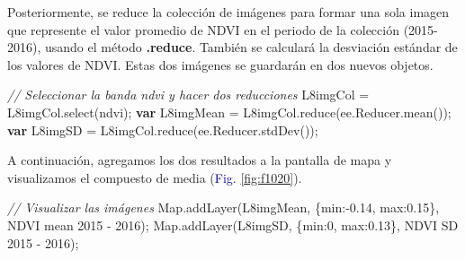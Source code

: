 \documentclass[
  12pt,
  letterpaper,
  twoside]{book}
\newenvironment{Shaded}{\begin{snugshade}}{\end{snugshade}}
\newcommand{\AttributeTok}[1]{\textcolor[rgb]{0.48,0.12,0.64}{#1}}
\newcommand{\BuiltInTok}[1]{#1}
\newcommand{\CommentTok}[1]{\textcolor[rgb]{0.24,0.58,0.00}{\textit{#1}}}
\newcommand{\DataTypeTok}[1]{\textcolor[rgb]{0.00,0.00,0.00}{#1}}
\newcommand{\DecValTok}[1]{\textcolor[rgb]{0.28,0.53,0.93}{#1}}
\newcommand{\FloatTok}[1]{\textcolor[rgb]{0.28,0.53,0.93}{#1}}
\newcommand{\FunctionTok}[1]{\textcolor[rgb]{0.48,0.12,0.64}{#1}}
\newcommand{\KeywordTok}[1]{\textcolor[rgb]{0.00,0.00,0.00}{\textbf{#1}}}
\newcommand{\NormalTok}[1]{#1}
\newcommand{\OperatorTok}[1]{\textcolor[rgb]{0.00,0.00,0.00}{#1}}
\newcommand{\StringTok}[1]{\textcolor[rgb]{0.87,0.29,0.22}{#1}}
\newcommand\boldpurple[1]{\textcolor{darkpurple}{\textbf{#1}}}
\begin{document}
Posteriormente, se reduce la colección de imágenes para formar una sola imagen que represente el valor promedio de NDVI en el periodo de la colección (2015-2016), usando el método \boldpurple{.reduce}. También se calculará la desviación estándar de los valores de NDVI. Estas dos imágenes se guardarán en dos nuevos objetos.

\begin{Shaded}
\begin{Highlighting}[]
\CommentTok{// Seleccionar la banda ndvi y hacer dos reducciones}
\NormalTok{L8imgCol }\OperatorTok{=}\NormalTok{ L8imgCol}\OperatorTok{.}\FunctionTok{select}\NormalTok{(}\StringTok{\textquotesingle{}ndvi\textquotesingle{}}\NormalTok{)}\OperatorTok{;}
\KeywordTok{var}\NormalTok{ L8imgMean }\OperatorTok{=}\NormalTok{ L8imgCol}\OperatorTok{.}\FunctionTok{reduce}\NormalTok{(ee}\OperatorTok{.}\AttributeTok{Reducer}\OperatorTok{.}\FunctionTok{mean}\NormalTok{())}\OperatorTok{;}
\KeywordTok{var}\NormalTok{ L8imgSD }\OperatorTok{=}\NormalTok{ L8imgCol}\OperatorTok{.}\FunctionTok{reduce}\NormalTok{(ee}\OperatorTok{.}\AttributeTok{Reducer}\OperatorTok{.}\FunctionTok{stdDev}\NormalTok{())}\OperatorTok{;}
\end{Highlighting}
\end{Shaded}

A continuación, agregamos los dos resultados a la pantalla de mapa y visualizamos el compuesto de media (\textcolor{darkblue}{Fig.} \ref{fig:f1020}).

\begin{Shaded}
\begin{Highlighting}[]
\CommentTok{// Visualizar las imágenes}
\BuiltInTok{Map}\OperatorTok{.}\FunctionTok{addLayer}\NormalTok{(L8imgMean}\OperatorTok{,}\NormalTok{ \{}\DataTypeTok{min}\OperatorTok{:{-}}\FloatTok{0.14}\OperatorTok{,} \DataTypeTok{max}\OperatorTok{:}\FloatTok{0.15}\NormalTok{\}}\OperatorTok{,} \StringTok{\textquotesingle{}NDVI mean 2015 {-} 2016\textquotesingle{}}\NormalTok{)}\OperatorTok{;}
\BuiltInTok{Map}\OperatorTok{.}\FunctionTok{addLayer}\NormalTok{(L8imgSD}\OperatorTok{,}\NormalTok{ \{}\DataTypeTok{min}\OperatorTok{:}\DecValTok{0}\OperatorTok{,} \DataTypeTok{max}\OperatorTok{:}\FloatTok{0.13}\NormalTok{\}}\OperatorTok{,} \StringTok{\textquotesingle{}NDVI SD 2015 {-} 2016\textquotesingle{}}\NormalTok{)}\OperatorTok{;}
\end{Highlighting}
\end{Shaded}
\end{document}
